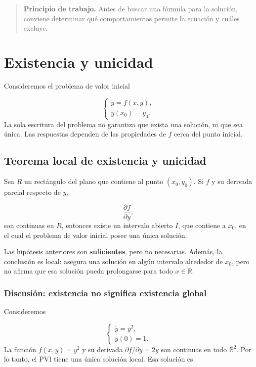 \documentclass[12pt,a4paper]{article}
\begin{document}
	\begin{quote}
		\textbf{Principio de trabajo.} Antes de buscar una fórmula para la solución, conviene determinar qué comportamientos permite la ecuación y cuáles excluye.
	\end{quote}

	\clearpage
	\section{Existencia y unicidad}

	Consideremos el problema de valor inicial

	\[
	\begin{cases}
		\dot{y}=f(x,y),\\[0.2cm]
		y(x_0)=y_0.
	\end{cases}
	\]
La sola escritura del problema no garantiza que exista una solución, ni que sea única. Las respuestas dependen de las propiedades de \(f\) cerca del punto inicial.

	\subsection{Teorema local de existencia y unicidad}

	Sea \(R\) un rectángulo del plano que contiene al punto \((x_0,y_0)\). Si \(f\) y su derivada parcial respecto de \(y\),

	\[
	\frac{\partial f}{\partial y},
	\]
son continuas en \(R\), entonces existe un intervalo abierto \(I\), que contiene a \(x_0\), en el cual el problema de valor inicial posee una única solución.

	Las hipótesis anteriores son \textbf{suficientes}, pero no necesarias. Además, la conclusión es local: asegura una solución en algún intervalo alrededor de \(x_0\), pero no afirma que esa solución pueda prolongarse para todo \(x\in\mathbb{R}\).

	\subsubsection*{Discusión: existencia no significa existencia global}

	Consideremos

	\[
	\begin{cases}
		\dot{y}=y^2,\\
		y(0)=1.
	\end{cases}
	\]
La función \(f(x,y)=y^2\) y su derivada \(\partial f/\partial y=2y\) son continuas en todo \(\mathbb{R}^2\). Por lo tanto, el PVI tiene una única solución local. Esa solución es
\end{document}
